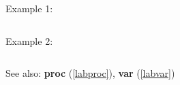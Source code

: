 \noindent Example 1: 
\begin{center}\begin{minipage}{15cm}\begin{Verbatim}[frame=single]
\end{Verbatim}
\end{minipage}\end{center}
\noindent Example 2: 
\begin{center}\begin{minipage}{15cm}\begin{Verbatim}[frame=single]
\end{Verbatim}
\end{minipage}\end{center}
See also: \textbf{proc} (\ref{labproc}), \textbf{var} (\ref{labvar})

